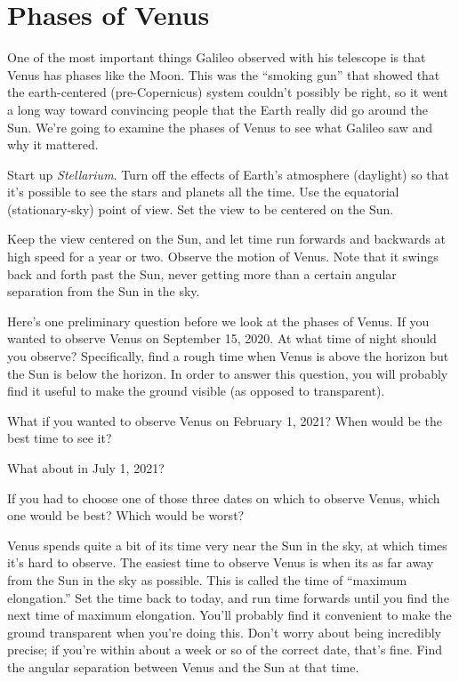 \section{Phases of Venus}

\makelabheader 

One of the most important things Galileo observed with his telescope is that
Venus has phases like the Moon.   This was the ``smoking gun'' that showed
that the earth-centered (pre-Copernicus) system couldn't possibly be right,
so it went a long way toward convincing people that the Earth really did
go around the Sun.  We're going to examine the phases of Venus to see what
Galileo saw and why it mattered. 

Start up \textit{Stellarium}.
Turn off 
the effects of Earth's atmosphere (daylight)
so that it's possible to see the stars and planets all the time.
Use the equatorial (stationary-sky) point of view.
Set the view to be centered on the Sun.

Keep the view centered on the Sun, and let time run forwards and backwards 
at high speed for a year or two.
Observe the motion of Venus.  Note that it swings back and forth past the Sun,
never getting more than a certain angular separation from the Sun in the sky. 

Here's one preliminary question before we look at the phases of Venus.
If you wanted to observe Venus on September 15, 2020.
At what time of night should you
observe?  Specifically, find a rough time when Venus is above the
horizon but the Sun is below the horizon. In order to answer this
question, you will probably find it useful to make the ground visible (as
opposed to
transparent).



\answerspace{0.7in}

What if you wanted to observe Venus on February 1, 2021? When would be the
best time to see it?

\answerspace{ 0.7in}

What about in July 1, 2021?

\answerspace{ 0.7in}


If you had to choose one of those three dates on which to observe
Venus, which one would be best? Which would be worst?

\answerspace{ 0.7in}

\pagebreak[4]
Venus spends quite a bit of its time very near the Sun in the sky,
at which times it's hard to observe.
The easiest time to observe Venus is when its as far away from
the Sun in the sky as possible.  This is called the time of ``maximum
elongation.''  Set the time back to today, 
and run time forwards until you find the next time of maximum
elongation. You'll probably find it convenient to make the ground transparent
when you're doing this.
Don't worry about being incredibly precise; if you're
within about a week or so of the correct date, that's fine.
Find the angular
separation between
Venus and the Sun at that time. 


